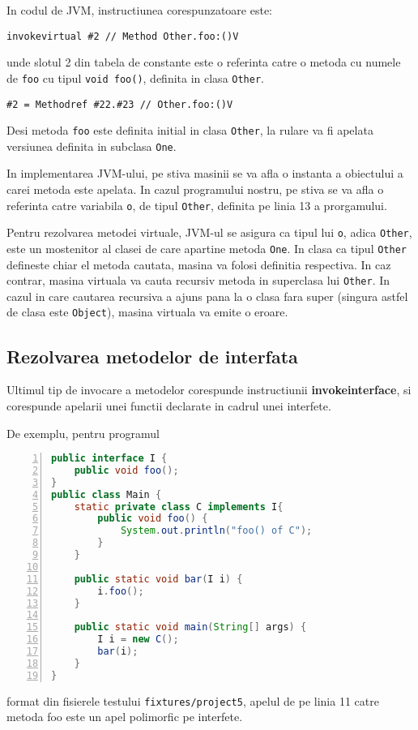 In codul de JVM, instructiunea corespunzatoare este:

\texttt{invokevirtual \#2                  // Method Other.foo:()V}

unde slotul 2 din tabela de constante este o referinta catre o metoda cu numele
de \texttt{foo} cu tipul \texttt{void foo()}, definita in clasa \texttt{Other}.

\texttt{\#2 = Methodref          \#22.\#23        // Other.foo:()V}

Desi metoda \texttt{foo} este definita initial in clasa \texttt{Other}, la
rulare va fi apelata versiunea definita in subclasa \texttt{One}.

In implementarea JVM-ului, pe stiva masinii se va afla o instanta a obiectului
a carei metoda este apelata. In cazul programului nostru, pe stiva se va afla o
referinta catre variabila \texttt{o}, de tipul \texttt{Other}, definita pe linia
13 a prorgamului.

Pentru rezolvarea metodei virtuale, JVM-ul se asigura ca tipul lui \texttt{o},
adica \texttt{Other}, este un mostenitor al clasei de care apartine metoda
\texttt{One}. In clasa ca tipul \texttt{Other} defineste chiar el metoda
cautata, masina va folosi definitia respectiva.
In caz contrar, masina virtuala va cauta recursiv metoda in superclasa lui
\texttt{Other}. In cazul in care cautarea recursiva a ajuns pana la o clasa fara
super (singura astfel de clasa este \texttt{Object}), masina virtuala va emite o
eroare.

\subsection{Rezolvarea metodelor de interfata}

Ultimul tip de invocare a metodelor corespunde instructiunii
\textbf{invokeinterface}, si corespunde apelarii unei functii declarate in cadrul
unei interfete.

De exemplu, pentru programul
\begin{lstlisting}[language=Java, numbers=left]
public interface I {
    public void foo();
}
public class Main {
    static private class C implements I{
        public void foo() {
            System.out.println("foo() of C");
        }
    }

    public static void bar(I i) {
        i.foo();
    }

    public static void main(String[] args) {
        I i = new C();
        bar(i);
    }
}
\end{lstlisting}
format din fisierele testului \texttt{fixtures/project5},
apelul de pe linia 11 catre metoda foo este un apel polimorfic pe interfete.

